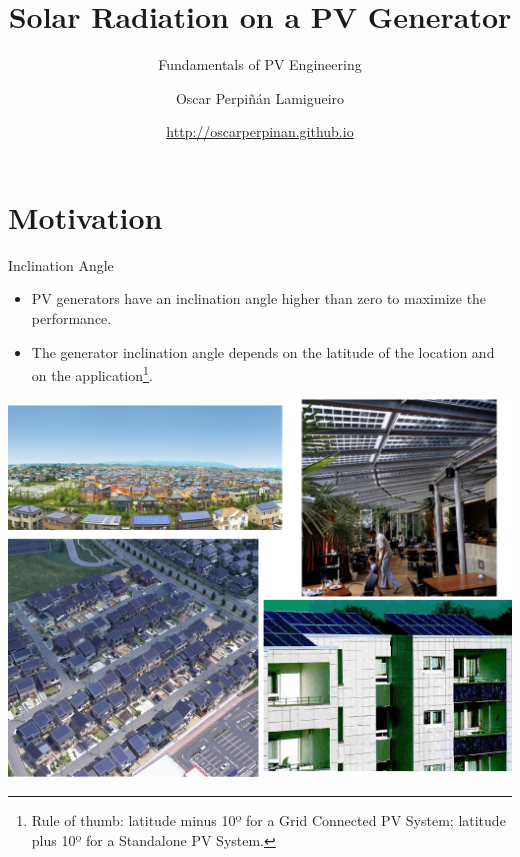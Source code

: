 \documentclass[xcolor={usenames,svgnames,dvipsnames}]{beamer}
\author{Oscar Perpiñán Lamigueiro}
\date{\url{http://oscarperpinan.github.io}}
\title{Solar Radiation on a PV Generator}
\subtitle{Fundamentals of PV Engineering}
\begin{document}
\maketitle

\section{Motivation}
\label{sec:orgb045702}
\begin{frame}[label={sec:org0511dda}]{Inclination Angle}
\begin{itemize}
\item PV generators have an \alert{inclination angle higher than zero} to maximize the performance.
\item The generator \alert{inclination angle} depends on the \alert{latitude} of the location and on the \alert{application}\footnote{Rule of thumb: latitude minus 10º for a Grid Connected PV System; latitude plus 10º for a Standalone PV System.}.
\end{itemize}

\begin{center}
\includegraphics[height=0.5\textheight]{../figs/PVUrban.png}
\end{center}
\end{frame}
\end{document}
